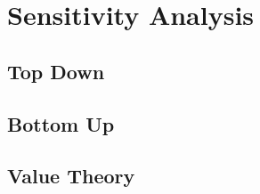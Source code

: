 \section{Sensitivity Analysis}\label{sec:sensitivity_analysis}
\subsection{Top Down}\label{subsec:sensitivity_analysis_top_down}
\subsection{Bottom Up}\label{subsec:sensitivity_analysis_bottom_up}
\subsection{Value Theory}\label{subsec:sensitivity_analysis_value_theory}